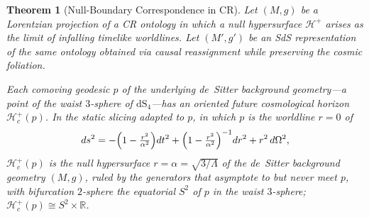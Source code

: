 \documentclass[11pt,a4paper]{article}
\theoremstyle{plain}
\newtheorem{theorem}{Theorem}
\theoremstyle{definition}
\theoremstyle{remark}
\begin{document}
\begin{theorem}[Null-Boundary Correspondence in CR]
\label{thm:null-boundary}
Let $(M,g)$ be a Lorentzian projection of a CR ontology in which a null hypersurface $\mathcal{H}^+$ arises as the limit of infalling timelike worldlines. Let $(M',g')$ be an SdS representation of the same ontology obtained via causal reassignment while preserving the cosmic foliation.

Each comoving geodesic $p$ of the underlying de~Sitter background geometry---a point of the waist $3$-sphere of $\mathrm{dS}_4$---has an oriented future cosmological horizon $\mathcal{H}_c^{+}(p)$. In the static slicing adapted to $p$, in which $p$ is the worldline $r=0$ of
\[
ds^2 = -\Bigl(1-\tfrac{r^2}{\alpha^2}\Bigr)dt^2 + \Bigl(1-\tfrac{r^2}{\alpha^2}\Bigr)^{-1}dr^2 + r^2\,d\Omega^2,
\]
$\mathcal{H}_c^{+}(p)$ is the null hypersurface $r=\alpha=\sqrt{3/\Lambda}$ of the de~Sitter background geometry $(M,g)$, ruled by the generators that asymptote to but never meet $p$, with bifurcation $2$-sphere the equatorial $S^2$ of $p$ in the waist $3$-sphere; $\mathcal{H}_c^{+}(p)\cong S^2\times\mathbb{R}$.


\end{theorem}
\end{document}
